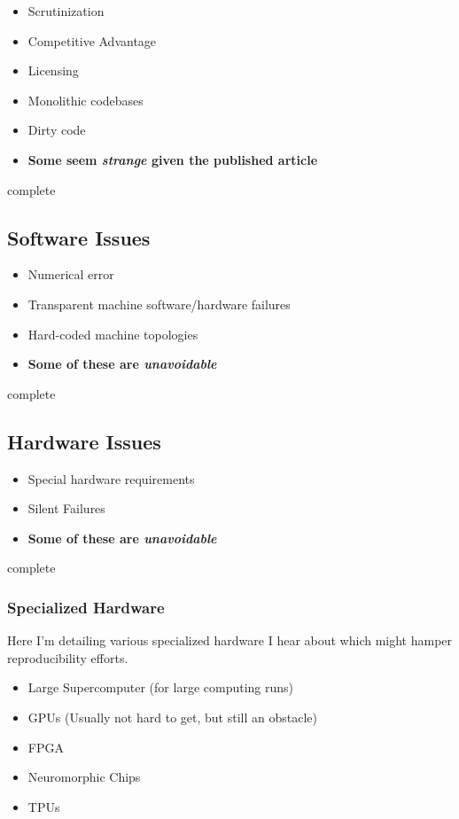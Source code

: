 \documentclass{article}
\newcommand{\complete}{
	\gls{complete}
}
\begin{document}
\begin{itemize}
\item Scrutinization
\item Competitive Advantage
\item Licensing
\item Monolithic codebases
\item Dirty code
\item \textbf{Some seem \textit{strange} given the published article}
\end{itemize}

\complete

\subsection{Software Issues}

\begin{itemize}
\item Numerical error
\item Transparent machine software/hardware failures
\item Hard-coded machine topologies
\item \textbf{Some of these are \textit{unavoidable}}
\end{itemize}

\complete

\subsection{Hardware Issues}

\begin{itemize}
\item Special hardware requirements
\item Silent Failures
\item \textbf{Some of these are \textit{unavoidable}}
\end{itemize}

\complete

\subsubsection{Specialized Hardware}

Here I'm detailing various specialized hardware I hear about which might hamper reproducibility efforts.

\begin{itemize}
\item Large Supercomputer (for large computing runs)
\item GPUs (Usually not hard to get, but still an obstacle)
\item FPGA
\item Neuromorphic Chips \cite{neuromorphic-chips-webarticle}
\item TPUs \cite{jouppi-tpu-performance-2017}
\end{itemize}
\end{document}
